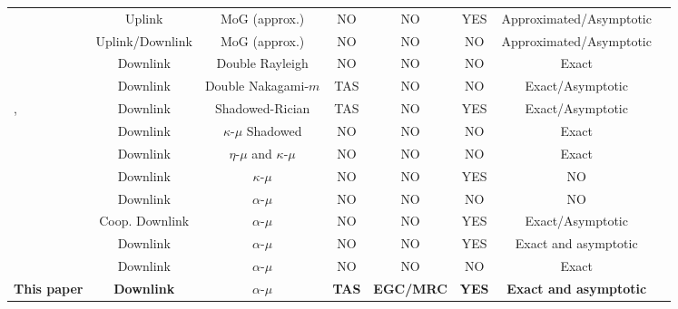 \documentclass[11pt]{article}
\begin{document}
\begin{table}[htbp]
{\begin{tabular}{l c c c c c c c}
\vspace{0.05cm} 
 & Uplink &  MoG (approx.) & NO & NO & YES  & Approximated/Asymptotic \\
\vspace{0.05cm} 
 & Uplink/Downlink &  MoG (approx.) & NO & NO & NO & Approximated/Asymptotic \\
\vspace{0.05cm} 
  & Downlink & Double Rayleigh & NO & NO & NO & Exact \\
\vspace{0.05cm} 
 & Downlink & Double Nakagami-$m$ & TAS & NO & NO & Exact/Asymptotic \\
\vspace{0.05cm} 
, & Downlink & Shadowed-Rician & TAS & NO & YES  &  Exact/Asymptotic \\
\vspace{0.05cm} 
 & Downlink & $\kappa$-$\mu$ Shadowed & NO & NO &  NO & Exact  \\
 \vspace{0.05cm} 
 & Downlink & $\eta$-$\mu$ and $\kappa$-$\mu$ & NO & NO & NO & Exact \\
\vspace{0.05cm} 
& Downlink & $\kappa$-$\mu$ & NO & NO &  YES & NO  \\
\vspace{0.05cm} 
 & Downlink & $\alpha$-$\mu$ & NO & NO & NO & NO  \\
\vspace{0.05cm} 
  & Coop. Downlink & $\alpha$-$\mu$ & NO & NO & YES &   Exact/Asymptotic \\
\vspace{0.05cm} 
  & Downlink & $\alpha$-$\mu$ & NO &  NO & YES & Exact and asymptotic  \\
\vspace{0.05cm} 
 & Downlink & $\alpha$-$\mu$ & NO & NO & NO & Exact  \\
\vspace{0.05cm} 
\textbf{This paper} & \textbf{Downlink} &  $\alpha$-$\mu$ & \textbf{TAS} & \textbf{EGC/MRC} & \textbf{YES} & \textbf{Exact and asymptotic}  \\
\hline
\end{tabular}
}
\end{table}
\end{document}
